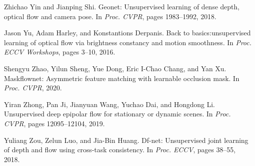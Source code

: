 \documentclass[final]{cvpr}
\begin{document}
\begin{thebibliography}{10}
	Zhichao Yin and Jianping Shi.
	\newblock Geonet: Unsupervised learning of dense depth, optical flow and camera
	pose.
	\newblock In {\em {Proc. CVPR}}, pages 1983--1992, 2018.
	
	Jason Yu, Adam Harley, and Konstantions Derpanis.
	\newblock Back to basics:unsupervised learning of optical flow via brightness
	constancy and motion smoothness.
	\newblock In {\em Proc. ECCV Workshops}, pages 3--10, 2016.
	
	Shengyu Zhao, Yilun Sheng, Yue Dong, Eric I-Chao Chang, and Yan Xu.
	\newblock Maskflownet: Asymmetric feature matching with learnable occlusion
	mask.
	\newblock In {\em {Proc. CVPR}}, 2020.
	
	Yiran Zhong, Pan Ji, Jianyuan Wang, Yuchao Dai, and Hongdong Li.
	\newblock Unsupervised deep epipolar flow for stationary or dynamic scenes.
	\newblock In {\em {Proc. CVPR}}, pages 12095--12104, 2019.
	
	Yuliang Zou, Zelun Luo, and Jia-Bin Huang.
	\newblock Df-net: Unsupervised joint learning of depth and flow using
	cross-task consistency.
	\newblock In {\em {Proc. ECCV}}, pages 38--55, 2018.
	
\end{thebibliography}
\end{document}
